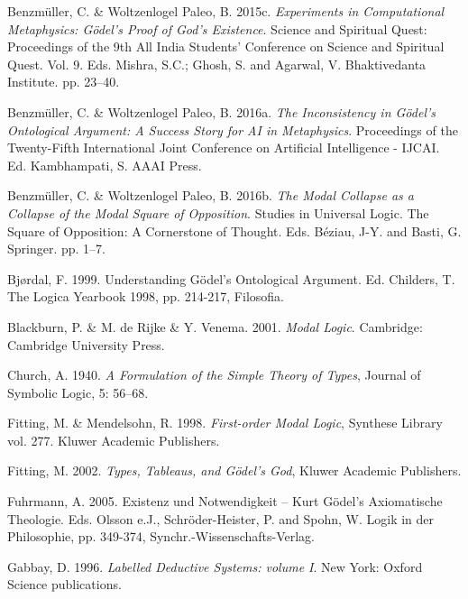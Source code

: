 \documentclass[smallextended]{svjour3}
\begin{document}
\begin{thebibliography}{9}
Benzm\"uller, C. \& Woltzenlogel Paleo, B. 2015c. {\itshape Experiments in Computational Metaphysics: G\"odel's Proof of God's Existence}. Science and Spiritual Quest: Proceedings of the 9th All India Students' Conference on Science and Spiritual Quest. Vol. 9. Eds. Mishra, S.C.; Ghosh, S. and Agarwal, V. Bhaktivedanta Institute. pp. 23--40. 

Benzm\"uller, C. \& Woltzenlogel Paleo, B. 2016a. {\itshape The Inconsistency in G\"odel's Ontological Argument: A Success Story for AI in Metaphysics}. Proceedings of the Twenty-Fifth International Joint Conference on Artificial Intelligence - IJCAI. Ed. Kambhampati, S. AAAI Press. 

Benzm\"uller, C. \& Woltzenlogel Paleo, B. 2016b. {\itshape The Modal Collapse as a Collapse of the Modal Square of Opposition}. Studies in Universal Logic. The Square of Opposition: A Cornerstone of Thought. Eds. B\'{e}ziau, J-Y. and Basti, G. Springer. pp. 1--7. 

Bj{\o}rdal, F. 1999. Understanding G\"odel's Ontological Argument. Ed. Childers, T. The Logica Yearbook 1998, pp. 214-217, Filosofia.

Blackburn, P. \&  M. de Rijke \& Y. Venema. 2001. {\itshape Modal Logic}. Cambridge: Cambridge University Press.

Church, A. 1940. {\itshape A Formulation of the Simple Theory of Types}, Journal of Symbolic Logic, 5: 56--68. 

Fitting, M. \& Mendelsohn, R. 1998.  {\itshape First-order Modal Logic}, Synthese Library vol. 277. Kluwer Academic Publishers.  

Fitting, M. 2002.  {\itshape Types, Tableaus, and G\"odel's God}, Kluwer Academic Publishers.  

Fuhrmann, A. 2005.
Existenz und Notwendigkeit -- Kurt G\"odel's Axiomatische Theologie. Eds. Olsson e.J., Schr\"oder-Heister, P. and Spohn, W. Logik in der Philosophie, pp. 349-374, Synchr.-Wissenschafts-Verlag.

Gabbay, D. 1996. {\itshape Labelled Deductive Systems: volume I}. New York: Oxford Science publications. 


\end{thebibliography}
\end{document}
